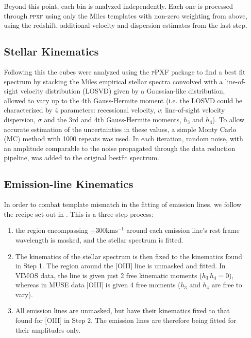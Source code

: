 		Beyond this point, each bin is analyzed independently. Each one is processed through \textsc{ppxf} using only the Miles templates with non-zero weighting from above, using the redshift, additional velocity and dispersion estimates from the last step.


	\subsection{Stellar Kinematics}
		Following this the cubes were analyzed using the \textsc{pPXF} package \citep{Cappellari2004} to find a best fit spectrum by stacking the Miles empirical stellar spectra \citep{Sanchez-Blazquez2006} convolved with a line-of-sight velocity distribution (LOSVD) given by a Gaussian-like distribution, allowed to vary up to the 4th Gauss-Hermite moment (i.e. the LOSVD could be characterized by 4 parameters: recessional velocity, $v$; line-of-sight velocity dispersion, $\sigma$ and the 3rd and 4th Gauss-Hermite moments, $h_3$ and $h_4$). To allow accurate estimation of the uncertainties in these values, a simple Monty Carlo (MC) method with 1000 repeats was used. In each iteration, random noise, with an amplitude comparable to the noise propagated through the data reduction pipeline, was added to the original bestfit spectrum.



	 \subsection{Emission-line Kinematics}
	 	In order to combat template mismatch in the fitting of emission lines, we follow the recipe set out in \citet{Sarzi2005}. This is a three step process:
		\begin{enumerate}
			\item the region encompassing $\pm 300 \mathrm{km s^{-1}}$ around each emission line's rest frame wavelength is masked, and the stellar spectrum is fitted.
			\item The kinematics of the stellar spectrum is then fixed to the kinematics found in Step 1. The region around the [OIII] line is unmasked and fitted. In VIMOS data, the line is given just 2 free kinematic moments ($h_3 \, h_4 = 0$), whereas in MUSE data [OIII] is given 4 free moments ($h_3$ and $h_4$ are free to vary). 
			\item All emission lines are unmasked, but have their kinematics fixed to that found for [OIII] in Step 2. The emission lines are therefore being fitted for their amplitudes only. 
		\end{enumerate}

